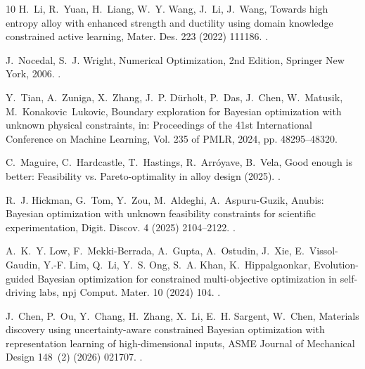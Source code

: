 \documentclass[preprint,12pt,times]{elsarticle}  %
\providecommand{\JournalTitle}[1]{#1}
\begin{document}
\begin{thebibliography}{10}
H.~Li, R.~Yuan, H.~Liang, W.~Y. Wang, J.~Li, J.~Wang, Towards high entropy
  alloy with enhanced strength and ductility using domain knowledge constrained
  active learning, {\JournalTitle{Mater. Des.}} 223 (2022) 111186.
\newblock \href {http://dx.doi.org/10.1016/j.matdes.2022.111186}
  {}.

J.~Nocedal, S.~J. Wright, Numerical Optimization, 2nd Edition, Springer New
  York, 2006.
\newblock \href {http://dx.doi.org/10.1007/978-0-387-40065-5}
  {}.

Y.~Tian, A.~Zuniga, X.~Zhang, J.~P. D{\"u}rholt, P.~Das, J.~Chen, W.~Matusik,
  M.~Konakovic~Lukovic, Boundary exploration for {Bayesian} optimization with
  unknown physical constraints, in: Proceedings of the 41st International
  Conference on Machine Learning, Vol. 235 of PMLR, 2024, pp. 48295--48320.

C.~Maguire, C.~Hardcastle, T.~Hastings, R.~Arr{\'o}yave, B.~Vela, Good enough
  is better: Feasibility vs. {Pareto}-optimality in alloy design (2025).
\newblock \href {http://arxiv.org/abs/2510.20125} {}.

R.~J. Hickman, G.~Tom, Y.~Zou, M.~Aldeghi, A.~Aspuru-Guzik, Anubis: {Bayesian}
  optimization with unknown feasibility constraints for scientific
  experimentation, {\JournalTitle{Digit. Discov.}} 4 (2025) 2104--2122.
\newblock \href {http://dx.doi.org/10.1039/D5DD00018A}
  {}.

A.~K.~Y. Low, F.~Mekki-Berrada, A.~Gupta, A.~Ostudin, J.~Xie, E.~Vissol-Gaudin,
  Y.-F. Lim, Q.~Li, Y.~S. Ong, S.~A. Khan, K.~Hippalgaonkar, Evolution-guided
  {Bayesian} optimization for constrained multi-objective optimization in
  self-driving labs, {\JournalTitle{npj Comput. Mater.}} 10 (2024)
  104.
\newblock \href {http://dx.doi.org/10.1038/s41524-024-01274-x}
  {}.

J.~Chen, P.~Ou, Y.~Chang, H.~Zhang, X.~Li, E.~H. Sargent, W.~Chen, Materials
  discovery using uncertainty-aware constrained {Bayesian} optimization with
  representation learning of high-dimensional inputs, {\JournalTitle{ASME
  Journal of Mechanical Design}} 148~(2) (2026) 021707.
\newblock \href {http://dx.doi.org/10.1115/1.4070206}
  {}.


\end{thebibliography}
\end{document}
